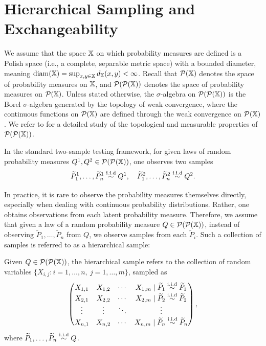 \section{Hierarchical Sampling and Exchangeability}\label{section:hierarchical_sampling}



We assume that the space $\mathbb{X}$ on which probability measures are defined is a Polish space (i.e., a complete, separable metric space) with a bounded diameter, meaning $\operatorname{diam}(\mathbb{X}) = \sup_{x,y \in \mathbb{X}} d_{\mathbb{X}}(x,y) < \infty$. Recall that $\mathcal{P}(\mathbb{X})$ denotes the space of probability measures on $\mathbb{X}$, and $\mathcal{P}(\mathcal{P}(\mathbb{X}))$ denotes the space of probability measures on $\mathcal{P}(\mathbb{X})$. Unless stated otherwise, the $\sigma$-algebra on $\mathcal{P}(\mathcal{P}(\mathbb{X}))$ is the Borel $\sigma$-algebra generated by the topology of weak convergence, where the continuous functions on $\mathcal{P}(\mathbb{X})$ are defined through the weak convergence on $\mathcal{P}(\mathbb{X})$. We refer to \cite{kallenberg2017random} for a detailed study of the topological and measurable properties of $\mathcal{P}(\mathcal{P}(\mathbb{X}))$.

In the standard two-sample testing framework, for given laws of random probability measures $Q^1,Q^2 \in \mathcal{P}(\mathcal{P}(\mathbb{X}))$, one observes two samples
\[
\widetilde{P}^1_1,\dots, \widetilde{P}^1_n \overset{\mathrm{i.i.d}}{\sim} Q^1,
\quad
\widetilde{P}^2_1,\dots, \widetilde{P}^2_n \overset{\mathrm{i.i.d}}{\sim} Q^2.
\]

In practice, it is rare to observe the probability measures themselves directly, especially when dealing with continuous probability distributions. Rather, one obtains observations from each latent probability measure. Therefore, we assume that given a law of a random probability measure $Q \in \mathcal{P}(\mathcal{P}(\mathbb{X}))$, instead of observing $\widetilde{P}_1, \dots, \widetilde{P}_n$ from $Q$, we observe samples from each $\widetilde{P}_i$. Such a collection of samples is referred to as a hierarchical sample:

\begin{definition}
    \label{def:hier_sample}
    Given $Q \in \mathcal{P}(\mathcal{P}(\mathbb{X}))$, the hierarchical sample refers to the collection of random variables $\{X_{i,j} : i=1,\dots,n,\ j=1,\dots,m\}$, sampled as 
    \[
    \begin{pmatrix}
    X_{1,1} & X_{1,2} & \cdots & X_{1,m} \mid \widetilde{P}_1 \overset{\mathrm{i.i.d}}{\sim} \widetilde{P}_1 \\
    X_{2,1} & X_{2,2} & \cdots & X_{2,m} \mid \widetilde{P}_2 \overset{\mathrm{i.i.d}}{\sim} \widetilde{P}_2 \\
    \vdots & \vdots & \ddots & \vdots \\
    X_{n,1} & X_{n,2} & \cdots & X_{n,m} \mid \widetilde{P}_n \overset{\mathrm{i.i.d}}{\sim} \widetilde{P}_n
    \end{pmatrix},
    \] 
    where $\widetilde{P}_1, \dots, \widetilde{P}_n \overset{\mathrm{i.i.d}}{\sim} Q$.
\end{definition}

